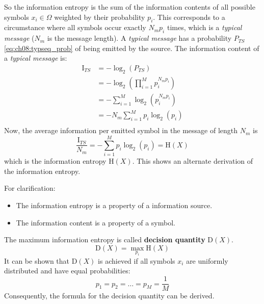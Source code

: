 \begin{refsection}
So the information entropy is the sum of the information contents of all possible symbols $x_i \in \Omega$ weighted by their probability $p_i$. This corresponds to a circumstance where all symbols occur exactly $N_m p_i$ times, which is a \emph{typical message} ($N_m$ is the message length). A \emph{typical message} has a probability $P_{TS}$ \eqref{eq:ch08:typseq_prob} of being emitted by the source. The information content of a \emph{typical message} is:
\begin{equation}
	\begin{split}
		\mathrm{I}_{TS} &= - \log_2 \left(P_{TS}\right) \\
		 &= - \log_2 \left(\prod\limits_{i = 1}^{M} p_i^{N_m p_i}\right) \\
		 &= - \sum_{i = 1}^{M} \log_2 \left(p_i^{N_m p_i}\right) \\
		 &= - N_m \sum_{i = 1}^{M} p_i \log_2 \left(p_i\right) \\
	\end{split}
\end{equation}
Now, the average information per emitted symbol in the message of length $N_m$ is
\begin{equation}
	\frac{\mathrm{I}_{TS}}{N_m} = - \sum_{i = 1}^{M} p_i \log_2 \left(p_i\right) = \mathrm{H}(X)
\end{equation}
which is the information entropy $\mathrm{H}(X)$. This shows an alternate derivation of the information entropy.

\begin{fact}
	For clarification:
	\begin{itemize}
		\item The information entropy is a property of a information source.
		\item The information content is a property of a symbol.
	\end{itemize}
\end{fact}

The maximum information entropy is called  \textbf{decision quantity} $\mathrm{D}(X)$.
\begin{equation}
	\mathrm{D}(X) = \max\limits_{p_i} \mathrm{H}(X)
\end{equation}
It can be shown that $\mathrm{D}(X)$ is achieved if all symbols $x_i$ are uniformly distributed and have equal probabilities:
\begin{equation}
	p_1 = p_2 = \ldots = p_M = \frac{1}{M}
\end{equation}
Consequently, the formula for the decision quantity can be derived.


\end{refsection}
